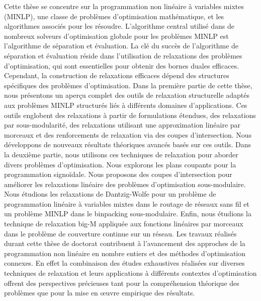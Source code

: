 \begin{abstractfr}
Cette thèse se concentre sur la programmation non linéaire à variables mixtes (MINLP), une classe de problèmes d'optimisation mathématique, et les algorithmes associés pour les résoudre. L'algorithme central utilisé dans de nombreux solveurs d'optimisation globale pour les problèmes MINLP est l'algorithme  de séparation et évaluation. La clé du succès de l'algorithme  de séparation et évaluation réside dans l'utilisation de relaxations des problèmes d'optimisation, qui sont essentielles pour obtenir des bornes duales efficaces.
Cependant, la construction de relaxations efficaces dépend des structures spécifiques des problèmes d'optimisation. Dans la première partie de cette thèse, nous présentons un aperçu complet des outils de relaxation structurelle adaptés aux problèmes MINLP structurés liés à
différents domaines d’applications. Ces outils englobent des relaxations à partir de formulations étendues, des relaxations par sous-modularité, des relaxations utilisant une approximation linéaire par morceaux et des renforcements de relaxation via des coupes d'intersection. Nous développons de nouveaux résultats théoriques avancés basés sur ces outils. Dans la deuxième partie, nous utilisons ces techniques de relaxation pour aborder divers problèmes d'optimisation. Nous explorons les plans coupants pour la programmation signoïdale. Nous proposons des coupes d'intersection pour améliorer les relaxations  linéaire des problèmes d'optimisation sous-modulaire.
Nous étudions les relaxations de Dantzig-Wolfe pour un problème de programmation linéaire à variables mixtes dans le routage de réseaux sans fil et un problème MINLP dans le binpacking sous-modulaire. Enfin, nous étudions la technique de relaxation big-M appliquée aux fonctions linéaires par morceaux dans le problème de couverture continue sur un réseau. 
Les travaux réalisés durant cette thèse de doctorat contribuent à l’avancement des approches de la programmation non linéaire en nombre entiers et des méthodes d’optimisation connexes.
En effet la combinaison des études exhaustives réalisées sur diverses techniques de relaxation et leurs applications à différents contextes d’optimisation offrent des perspectives précieuses tant pour la compréhension théorique des problèmes que pour la mise en œuvre empirique des résultats.
\end{abstractfr}

